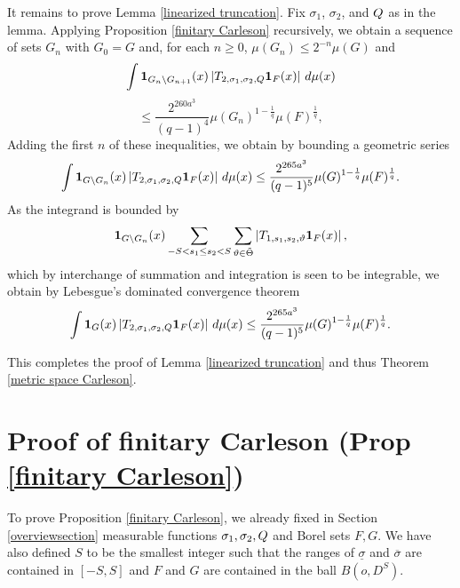 It remains to prove Lemma \ref{linearized truncation}.
Fix $\sigma_1$, $\sigma_2$,
and ${Q}$ as in  the lemma.
Applying Proposition \ref{finitary Carleson} recursively, we obtain
a sequence of sets $G_n$ with $G_0=G$ and,
for each $n\ge 0$, $\mu(G_{n})\le 2^{-n} \mu(G)$ and
\begin{equation*}
    \int \mathbf{1}_{G_{n}\setminus G_{n+1}}(x)
    \left| {T}_{2,\sigma_1,\sigma_2, {Q}} \mathbf{1}_{F}(x) \right|\, d\mu(x)
\end{equation*}
\begin{equation}
    \le \frac{2^{260a^3}}{(q-1)^4} \mu(G_n)^{1 - \frac{1}{q}} \mu(F)^{\frac{1}{q}},
\end{equation}
Adding the first $n$ of these inequalities, we obtain by bounding a geometric series
    \begin{equation} \label{Sqcut2}
    \int \mathbf{1}_{G\setminus G_{n}}(x)
\left| {T}_{2,\sigma_1,\sigma_2, {Q}}\mathbf{1}_F(x) \right|\, d\mu(x)
\le \frac{2^{265a^3}}{(q-1)^5} \mu(G)^{1-\frac{1}{q}} \mu(F)^{\frac{1}{q}}.
\end{equation}
As the integrand is bounded by
\begin{equation}\mathbf{1}_{G\setminus G_{n}}(x)
\sum_{-S<s_1\le s_2<S}\sum_{\vartheta\in\tilde{\Theta}}
\left| {T}_{1,s_1, s_2, \vartheta} \mathbf{1}_{F}(x) \right|,
\end{equation}
which by interchange of summation and integration is seen to be integrable, we obtain by Lebesgue's dominated convergence theorem
 \begin{equation} \label{Sqcut3}
    \int \mathbf{1}_{G}(x)
\left| {T}_{2,\sigma_1,\sigma_2, {Q}}\mathbf{1}_F(x) \right|\, d\mu(x)
\le \frac{2^{265a^3}}{(q-1)^5} \mu(G)^{1-\frac{1}{q}} \mu(F)^{\frac{1}{q}}.
\end{equation}



This completes the proof of Lemma \ref{linearized truncation}
and thus Theorem \ref{metric space Carleson}.

\section{Proof of finitary Carleson (Prop \ref{finitary Carleson})}
\label{christsection}

To prove Proposition
\ref{finitary Carleson}, we already fixed in Section \ref{overviewsection}
measurable functions ${\sigma_1},\sigma_2,  {Q}$ and Borel sets $F,G$. We have also
defined $S$ to be the smallest
integer such that the ranges of
$\underline{\sigma}$ and $ \overline\sigma$ are contained in $[-S,S]$ and $F$ and $G$ are contained
in the ball $B(o, D^S)$.


